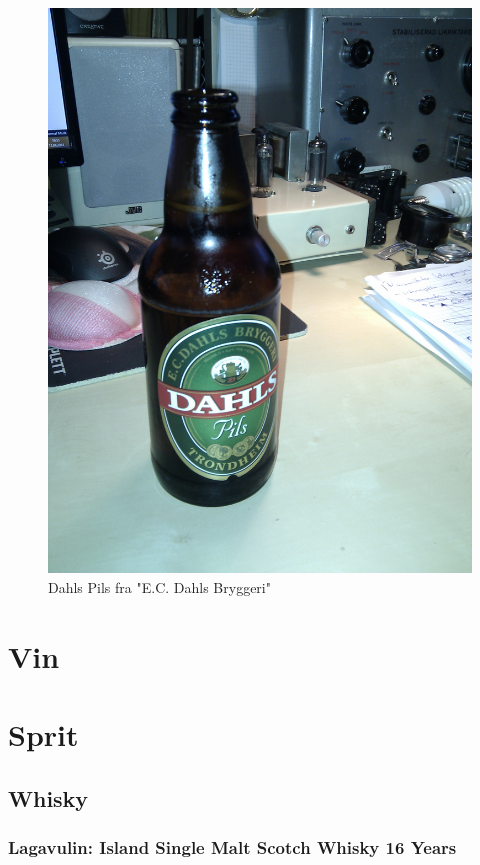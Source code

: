 \documentclass[12pt,a4paper,oneside,norsk]{article}
\begin{document}
\begin{figure} [H]
\centering
\includegraphics[scale=0.1, angle=0]{Bilder/Ol/dahls.jpg}
\caption{Dahls Pils fra "E.C. Dahls Bryggeri"}
\end{figure}

\newpage
\section{Vin}

\newpage
\section{Sprit}
\subsection{Whisky}
\subsubsection{Lagavulin: Island Single Malt Scotch Whisky 16 Years}
\end{document}

